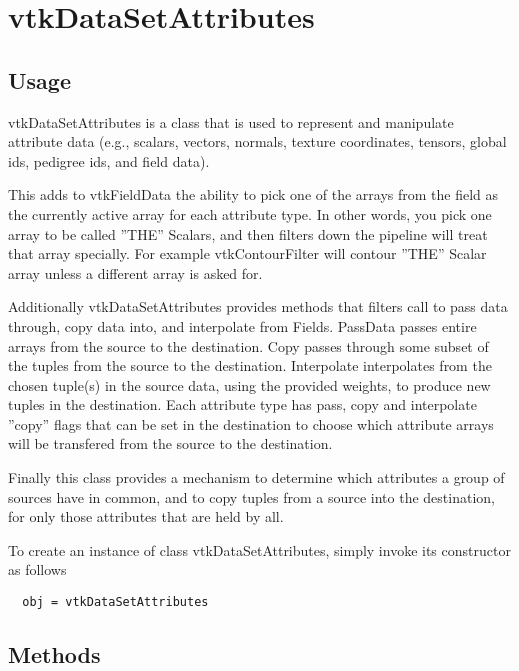 \section{vtkDataSetAttributes}

\subsection{Usage}

 vtkDataSetAttributes is a class that is used to represent and manipulate
 attribute data (e.g., scalars, vectors, normals, texture coordinates,
 tensors, global ids, pedigree ids, and field data). 

 This adds to vtkFieldData the ability to pick one of the arrays from the 
 field as the currently active array for each attribute type. In other 
 words, you pick one array to be called ''THE'' Scalars, and then filters down 
 the pipeline will treat that array specially. For example vtkContourFilter 
 will contour ''THE'' Scalar array unless a different array is asked for.

 Additionally vtkDataSetAttributes provides methods that filters call to 
 pass data through, copy data into, and interpolate from Fields. PassData 
 passes entire arrays from the source to the destination. Copy passes 
 through some subset of the tuples from the source to the destination. 
 Interpolate interpolates from the chosen tuple(s) in the source data, using 
 the provided weights, to produce new tuples in the destination. 
 Each attribute type has pass, copy and interpolate ''copy'' flags that 
 can be set in the destination to choose which attribute arrays will be
 transfered from the source to the destination. 
 
 Finally this class provides a mechanism to determine which attributes a 
 group of sources have in common, and to copy tuples from a source into 
 the destination, for only those attributes that are held by all.

To create an instance of class vtkDataSetAttributes, simply
invoke its constructor as follows
\begin{verbatim}
  obj = vtkDataSetAttributes
\end{verbatim}
\subsection{Methods}


